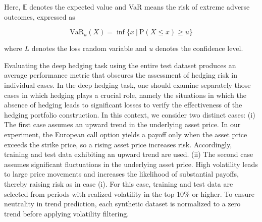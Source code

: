 \documentclass{article}
\begin{document}
Here, $\mathbb{E}$ denotes the expected value and VaR means the risk of extreme adverse outcomes, expressed as 

\begin{equation}
    \text{VaR}_u(X) = \inf \{ x ~| ~\text{P} (X \leq x) \geq u \}
\end{equation}

where $L$ denotes the loss random variable and $u$ denotes the confidence level.

Evaluating the deep hedging task using the entire test dataset produces an average performance metric that obscures the assessment of hedging risk in individual cases. In the deep hedging task, one should examine separately those cases in which hedging plays a crucial role, namely the situations in which the absence of hedging leads to significant losses to verify the effectiveness of the hedging portfolio construction. In this context, we consider two distinct cases:
(i) The first case assumes an upward trend in the underlying asset price. In our experiment, the European call option yields a payoff only when the asset price exceeds the strike price, so a rising asset price increases risk. Accordingly, training and test data exhibiting an upward trend are used.
(ii) The second case assumes significant fluctuations in the underlying asset price. High volatility leads to large price movements and increases the likelihood of substantial payoffs, thereby raising risk as in case (i). For this case, training and test data are selected from periods with realized volatility in the top 10$\%$ or higher. To ensure neutrality in trend prediction, each synthetic dataset is normalized to a zero trend before applying volatility filtering.
\end{document}
